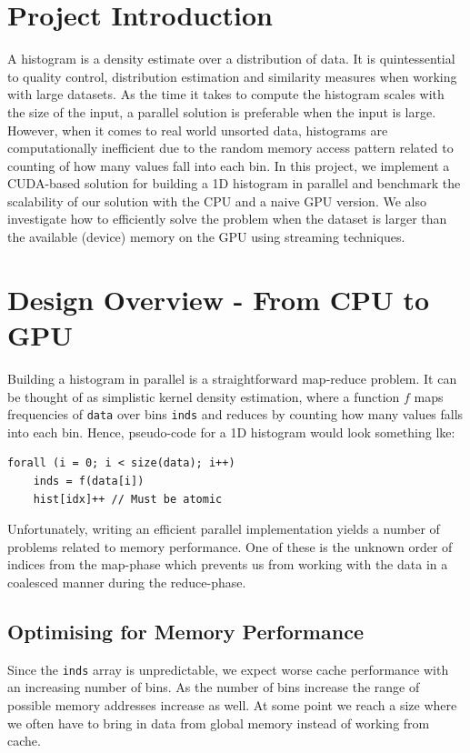 \documentclass[12pt, a4paper, hidelinks]{article}
\renewcommand{\tt}[1]{\texttt{#1}}
\begin{document}

\tableofcontents
\newpage

\section{Project Introduction}
A histogram is a density estimate over a distribution of data.
It is quintessential to quality control, distribution estimation
and similarity measures when working with large datasets.
As the time it takes to compute the histogram scales with the size of the input,
a parallel solution is preferable when the input is large.
However, when it comes to real world unsorted data,
histograms are computationally inefficient
due to the random memory access pattern related to counting of how many values fall into each bin.
In this project, we implement a CUDA-based solution for building a 1D histogram
in parallel and benchmark the scalability of our solution with
the CPU and a naive GPU version.
We also investigate how to efficiently solve the problem when the dataset
is larger than the available (device) memory on the GPU
using streaming techniques.

\section{Design Overview - From CPU to GPU}
Building a histogram in parallel is a straightforward map-reduce problem.
It can be thought of as simplistic kernel density estimation,
where a function $f$ maps frequencies of \tt{data} over bins \tt{inds}
and reduces by counting how many values falls into each bin.
Hence, pseudo-code for a 1D histogram would look something lke:

\begin{verbatim}
forall (i = 0; i < size(data); i++)
    inds = f(data[i])
    hist[idx]++ // Must be atomic
\end{verbatim}

Unfortunately, writing an efficient parallel implementation
yields a number of problems related to memory performance.
One of these is the unknown order of indices from the map-phase which
prevents us from working with the data in a coalesced
manner during the reduce-phase.

\subsection{Optimising for Memory Performance}
Since the \tt{inds} array is unpredictable,
we expect worse cache performance with an increasing number of bins.
As the number of bins increase the range of possible
memory addresses increase as well. At some point we reach a size where
we often have to bring in data from global memory instead of working
from cache.
\end{document}
